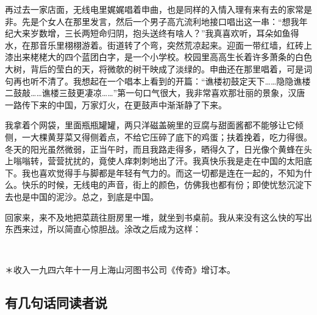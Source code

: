 \par 再过去一家店面，无线电里娓娓唱着申曲，也是同样的入情入理有来有去的家常是非。先是个女人在那里发言，然后一个男子高亢流利地接口唱出这一串：“想我年纪大来岁数增，三长两短命归阴，抱头送终有啥人？”我真喜欢听，耳朵如鱼得水，在那音乐里栩栩游着。街道转了个弯，突然荒凉起来。迎面一带红墙，红砖上漆出来栳栳大的四个蓝团白字，是一个小学校。校园里高高生长着许多萧条的白色大树，背后的莹白的天，将微欹的树干映成了淡绿的。申曲还在那里唱着，可是词句再也听不清了。我想起在一个唱本上看到的开篇：“谯楼初鼓定天下……隐隐谯楼二鼓敲……谯楼三鼓更凄凉……”第一句口气很大，我非常喜欢那壮丽的景象，汉唐一路传下来的中国，万家灯火，在更鼓声中渐渐静了下来。
\par 我拿着个网袋，里面瓶瓶罐罐，两只洋磁盖碗里的豆腐与甜面酱都不能够让它倾侧，一大棵黄芽菜又得侧着点，不给它压碎了底下的鸡蛋；扶着挽着，吃力得很。冬天的阳光虽然微弱，正当午时，而且我路走得多，晒得久了，日光像个黄蜂在头上嗡嗡转，营营扰扰的，竟使人痒刺刺地出了汗。我真快乐我是走在中国的太阳底下。我也喜欢觉得手与脚都是年轻有气力的。而这一切都是连在一起的，不知为什么。快乐的时候，无线电的声音，街上的颜色，仿佛我也都有份；即使忧愁沉淀下去也是中国的泥沙。总之，到底是中国。
\par 回家来，来不及地把菜蔬往厨房里一堆，就坐到书桌前。我从来没有这么快的写出东西来过，所以简直心惊胆战。涂改之后成为这样：
\par  
\par ＊收入一九四六年十一月上海山河图书公司《传奇》增订本。


\subsection{有几句话同读者说}

